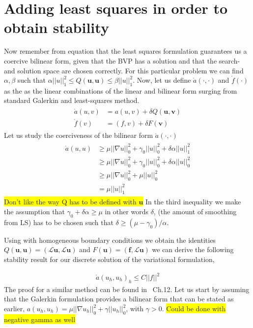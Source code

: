 \section{Adding least squares in order to obtain stability}

Now remember from equation  that the least squares formulation guarantees us a coercive bilinear form, given that the BVP has a solution and that the search- and solution space are chosen correctly. For this particular problem we can find $\alpha,\beta$ such that $\alpha||u||_1^2 \leq Q(\mathbf{u},\mathbf{u}) \leq \beta||u||_1^2 $.
Now, let us define $\mathring{a}(\cdot,\cdot)$ and $\mathring{f}(\cdot)$ as the as the linear combinations of the linear and bilinear form surging from standard Galerkin and least-squares method. 
\begin{align}
	\begin{split}
	\mathring{a}(u,v) &= a(u,v) + \delta Q(\mathbf{u},\mathbf{\mathbf{v}}) \\
	 \mathring{f}(v) &= (f,v) + \delta F(\mathbf{\mathbf{v}}) 
	\end{split}
	\label{eq:GLS}
\end{align}
Let us study the coerciveness of the bilinear form $\mathring{a}(\cdot,\cdot)$
\begin{align}
	\begin{split}
	\mathring{a}(u,u) &\geq \mu ||\nabla u||_0^2+\gamma_0||u||_0^2+\delta \alpha ||u||^2_1 \\
	&\geq \mu ||\nabla u||_0^2+\gamma_0||u||_0^2+\delta \alpha ||u||^2_0 \\
	&\geq \mu ||\nabla u||_0^2+\mu ||u||_0^2 \\
	&= \mu ||u||^2_1
	\end{split}
	\label{eq:coercivity}
\end{align}
\colorbox{yellow}{Don't like the way Q has to be defined with $\mathbf{u}$}
In the third inequality we make the assumption that $\gamma_0+\delta \alpha \geq \mu $ in other words $\delta$, (the amount of smoothing from LS) has to be chosen such that $\delta \geq (\mu-\gamma_0)/\alpha$.

Using  with homogeneous boundary conditions we obtain the identities $Q(\mathbf{u},\mathbf{u}) = (\mathcal{L}\mathbf{u},\mathcal{L}\mathbf{u})$ and $F(\mathbf{u}) = (\mathbf{f},\mathcal{L}\mathbf{u})$ we can derive the following stability result for our discrete solution of the variational formulation, 
	
\begin{align}
	\mathring{a}(u_h,u_h)_h \leq C ||f||^2
	\label{eq:stabilityResult}
\end{align}
The proof for a similar method can be found in~\cite{Quarteroni} Ch.12. 
Let us start by assuming that the Galerkin formulation provides a bilinear form that can be stated as earlier, $a(u_h,u_h)= \mu||\nabla u_h||^2_0 + \gamma||u_h||^2_0$, with $\gamma > 0$. 
\colorbox{yellow}{Could be done with negative gamma as well }

